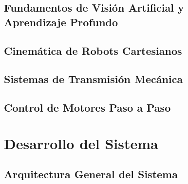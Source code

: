 \documentclass[a4paper,12pt]{report}
\begin{document}
\section{Fundamentos de Visión Artificial y Aprendizaje Profundo}





\section{Cinemática de Robots Cartesianos}




\section{Sistemas de Transmisión Mecánica}




\section{Control de Motores Paso a Paso}




\chapter{Desarrollo del Sistema}

\section{Arquitectura General del Sistema}




\end{document}
